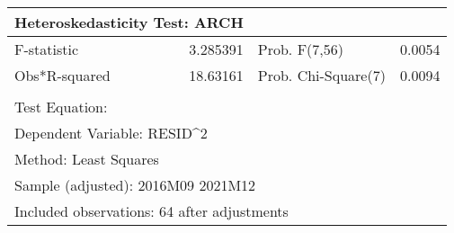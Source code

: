 
\begin{tabular}{lrrrr}
    \toprule
\multicolumn{2}{l}{Heteroskedasticity Test: ARCH}&\multicolumn{1}{c}{}&\multicolumn{1}{c}{}&\multicolumn{1}{c}{}\\
\midrule
\multicolumn{1}{l}{F-statistic}&\multicolumn{1}{r}{3.285391}&\multicolumn{2}{l}{Prob. F(7,56)}&\multicolumn{1}{r}{0.0054}\\
\multicolumn{1}{l}{Obs*R-squared}&\multicolumn{1}{r}{18.63161}&\multicolumn{2}{l}{Prob. Chi-Square(7)}&\multicolumn{1}{r}{0.0094}\\
\midrule
\multicolumn{1}{c}{}&\multicolumn{1}{c}{}&\multicolumn{1}{c}{}&\multicolumn{1}{c}{}&\multicolumn{1}{c}{}\\
\multicolumn{1}{l}{Test Equation:}&\multicolumn{1}{c}{}&\multicolumn{1}{c}{}&\multicolumn{1}{c}{}&\multicolumn{1}{c}{}\\
\multicolumn{2}{l}{Dependent Variable: RESID\textasciicircum 2}&\multicolumn{1}{c}{}&\multicolumn{1}{c}{}&\multicolumn{1}{c}{}\\
\multicolumn{2}{l}{Method: Least Squares}&\multicolumn{1}{c}{}&\multicolumn{1}{c}{}&\multicolumn{1}{c}{}\\
\multicolumn{3}{l}{Sample (adjusted): 2016M09 2021M12}&\multicolumn{1}{c}{}&\multicolumn{1}{c}{}\\
\multicolumn{4}{l}{Included observations: 64 after adjustments}&\multicolumn{1}{c}{}\\
\bottomrule
\end{tabular}
